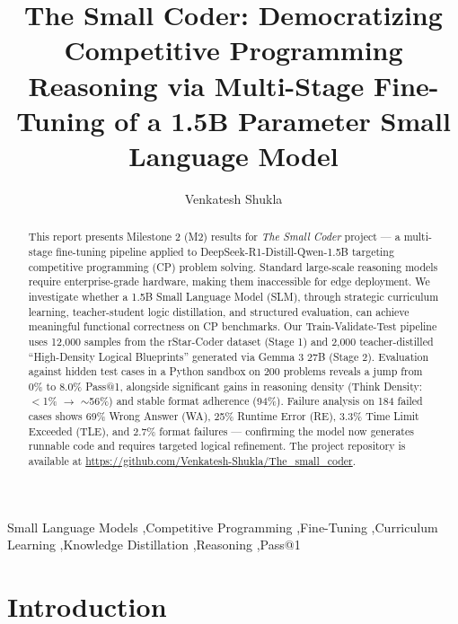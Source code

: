\documentclass[preprint,12pt]{elsarticle}
\begin{document}
\begin{frontmatter}

    \title{The Small Coder: Democratizing Competitive Programming Reasoning via Multi-Stage Fine-Tuning of a 1.5B Parameter Small Language Model}

    \author[inst1]{Venkatesh Shukla}

    \address[inst1]{NIT Kurukshetra, Computer Science and Engineering}

    \begin{abstract}
        This report presents Milestone 2 (M2) results for \textit{The Small Coder} project — a multi-stage fine-tuning pipeline applied to DeepSeek-R1-Distill-Qwen-1.5B targeting competitive programming (CP) problem solving. Standard large-scale reasoning models require enterprise-grade hardware, making them inaccessible for edge deployment. We investigate whether a 1.5B Small Language Model (SLM), through strategic curriculum learning, teacher-student logic distillation, and structured evaluation, can achieve meaningful functional correctness on CP benchmarks. Our Train-Validate-Test pipeline uses 12,000 samples from the rStar-Coder dataset (Stage 1) and 2,000 teacher-distilled ``High-Density Logical Blueprints'' generated via Gemma 3 27B (Stage 2). Evaluation against hidden test cases in a Python sandbox on 200 problems reveals a jump from 0\% to 8.0\% Pass@1, alongside significant gains in reasoning density (Think Density: $<$1\% $\rightarrow$ $\sim$56\%) and stable format adherence (94\%). Failure analysis on 184 failed cases shows 69\% Wrong Answer (WA), 25\% Runtime Error (RE), 3.3\% Time Limit Exceeded (TLE), and 2.7\% format failures — confirming the model now generates runnable code and requires targeted logical refinement. The project repository is available at \url{https://github.com/Venkatesh-Shukla/The_small_coder}.
    \end{abstract}

    \begin{keyword}
        Small Language Models \sep Competitive Programming \sep Fine-Tuning \sep Curriculum Learning \sep Knowledge Distillation \sep Reasoning \sep Pass@1
    \end{keyword}

\end{frontmatter}


\section{Introduction}
\label{sec:intro}
\end{document}
